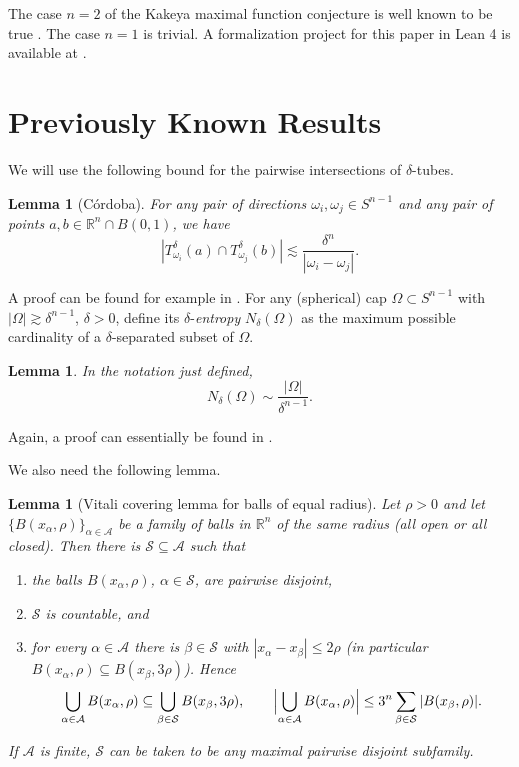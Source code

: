 \documentclass[11pt, letterpaper]{nyjm}
\newtheorem{lemma}[theorem]{Lemma}
\newcommand{\R}{\mathbb{R}}
\begin{document}
The case $n = 2$ of the Kakeya maximal function conjecture is well known to be
true \cite{Kroc}. The case $n = 1$ is trivial.
A formalization project for this paper in Lean 4 is available at
\cite{Aspegren2026Lean}.
\section{Previously Known Results}

We will use the following bound for the pairwise intersections of $\delta$-tubes.

\begin{lemma}[C\'ordoba]\label{lem:cordoba}
	For any pair of directions $\omega_i, \omega_j \in S^{n-1}$ and any pair of
	points $a, b \in \R^n \cap B(0,1)$, we have
	\[
	|T^{\delta}_{\omega_i}(a) \cap T^{\delta}_{\omega_j}(b)|
	\lesssim \frac{\delta^n}{|\omega_i - \omega_j|}.
	\]
\end{lemma}

A proof can be found for example in \cite{Kroc}. For any (spherical) cap
$\Omega \subset S^{n-1}$ with $|\Omega| \gtrsim \delta^{n-1}$, $\delta > 0$,
define its $\delta$-\emph{entropy} $N_\delta(\Omega)$ as the maximum possible
cardinality of a $\delta$-separated subset of $\Omega$.

\begin{lemma}\label{lem:entropy}
	In the notation just defined,
	\[
	N_\delta(\Omega) \sim \frac{|\Omega|}{\delta^{n-1}}.
	\]
\end{lemma}

Again, a proof can essentially be found in \cite{Kroc}.

We also need the following lemma.
\begin{lemma}[Vitali covering lemma for balls of equal radius]
	\label{lem:vitali-equal}
	Let $\rho>0$ and let $\{B(x_\alpha,\rho)\}_{\alpha\in\mathcal A}$ be a family of balls in $\mathbb R^n$
	of the same radius (all open or all closed). Then there is $\mathcal S\subseteq\mathcal A$ such that
	\begin{enumerate}
		\item[(i)] the balls $B(x_\alpha,\rho)$, $\alpha\in\mathcal S$, are pairwise disjoint,
		\item[(ii)] $\mathcal S$ is countable, and
		\item[(iii)] for every $\alpha\in\mathcal A$ there is $\beta\in\mathcal S$ with
		$|x_\alpha-x_\beta|\le2\rho$ (in particular $B(x_\alpha,\rho)\subseteq B(x_\beta,3\rho)$). Hence
		\[
		\bigcup_{\alpha\in\mathcal A}B(x_\alpha,\rho)\subseteq\bigcup_{\beta\in\mathcal S}B(x_\beta,3\rho),
		\qquad
		\Bigl|\bigcup_{\alpha\in\mathcal A}B(x_\alpha,\rho)\Bigr|\le3^n\sum_{\beta\in\mathcal S}|B(x_\beta,\rho)|.
		\]
	\end{enumerate}
	If $\mathcal A$ is finite, $\mathcal S$ can be taken to be any maximal pairwise disjoint subfamily.
\end{lemma}
\end{document}
